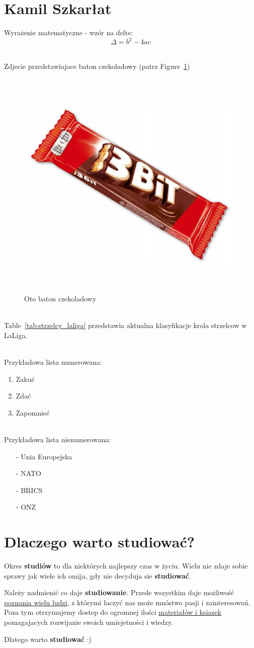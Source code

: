 \section{Kamil Szkarłat}


Wyrażenie matematyczne - wzór na delte:
\[ \Delta = b^2 - 4ac\]


\noindent %
\\Zdjecie przedstawiajace baton czekoladowy (patrz Figure~\ref{fig:baton})


\begin{figure}[htbp]
    \centering
    \includegraphics[width=0.3\linewidth]{pictures/trzybit.jpg}
    \caption{Oto baton czekoladowy}
    \label{fig:baton}
\end{figure}


\noindent
\\Table~\ref{tab:strzelcy_laliga} przedstawia aktualna klasyfikacje krola strzelcow w LaLiga.




\noindent
\\Przykładowa lista numerowana:
\begin{enumerate}
    \item Zakuć
    \item Zdać
    \item Zapomnieć
\end{enumerate}


\noindent
\\Przykładowa lista nienumerowana:
\begin{itemize}
    \item[-] Unia Europejska
    \item[-] NATO
    \item[-] BRICS
    \item[-] ONZ
\end{itemize}


\setlength{\parindent}{18pt}

\section*{Dlaczego warto studiować?}
Okres \textbf{studiów} to dla niektórych najlepszy czas w życiu. Wielu nie zdaje sobie sprawy jak wiele ich omija, gdy nie decyduja sie \textbf{studiować}.

Należy nadmienić co daje \textbf{studiowanie}. Przede wszystkim daje możliwość \underline{poznania wielu ludzi}, z którymi łaczyć nas może mnóstwo pasji i zainteresowań. Poza tym otrzymujemy dostep do ogromnej ilości \underline{materiałów i ksiazek} pomagajacych rozwijanie swoich umiejetności i wiedzy.

\noindent Dlatego warto \textbf{studiować} :) 
